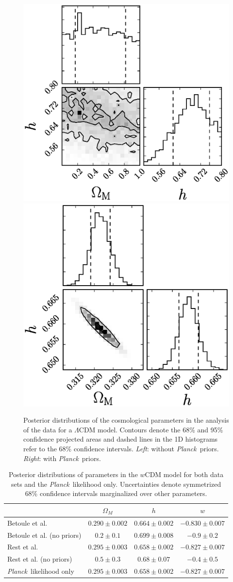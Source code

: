 \documentclass[12pt,a4paper]{article}
\newcommand\Planck{{\it Planck}\ }
\begin{document}
\begin{figure}
  \includegraphics[width=0.5\linewidth]{figures/rest_lcdm_noprior_corner.eps}
  \includegraphics[width=0.5\linewidth]{figures/rest_lcdm_withprior_corner.eps}
  \caption{Posterior distributions of the cosmological parameters in the
    analysis of the \citet{rest2014} data for a $\Lambda$CDM model. Contours denote the
    68\% and 95\% confidence projected areas and dashed lines in
    the 1D histograms refer to the 68\% confidence intervals. {\it Left}: without 
    \Planck priors. {\it Right}: with \Planck priors.}
  \label{fig:rest_lcdm_corner}
\end{figure}
%
\begin{table}[h]
  \centering
  \begin{tabular}{l|ccc}
    ~                          & $\Omega_M$ & $h$ & $w$ \\ \hline
    Betoule et al.             & $0.290 \pm 0.002$                      & $0.664 \pm 0.002$     & $-0.830 \pm 0.007$     \\
    Betoule et al. (no priors) & $0.2 \pm 0.1$                      & $0.699 \pm 0.008$     & $-0.9 \pm 0.2$     \\
    Rest et al.                & $0.295 \pm 0.003$                      & $0.658 \pm 0.002$     & $-0.827 \pm 0.007$     \\
    Rest et al. (no priors)    & $0.5 \pm 0.3$                      & $0.68 \pm 0.07$    & $-0.4 \pm 0.5$     \\
    \Planck likelihood only    & $0.295 \pm 0.003$                      & $0.658 \pm 0.002$     & $-0.827 \pm 0.007$     \\
  \end{tabular}
  \caption {Posterior distributions of parameters in the
    $w$CDM model for both data sets and the \Planck likelihood only. 
    Uncertainties denote symmetrized 68\%
    confidence intervals marginalized over other parameters.}
  \label{tab:wcdm}
\end{table}
\end{document}
